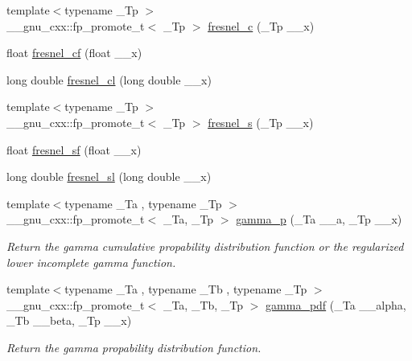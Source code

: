 \begin{DoxyCompactItemize}
{\footnotesize template$<$typename \+\_\+\+Tp $>$ }\\\+\_\+\+\_\+gnu\+\_\+cxx\+::fp\+\_\+promote\+\_\+t$<$ \+\_\+\+Tp $>$ \hyperlink{group__gnu__math__spec__func_ga92a3585165bfad3f9972fb4210140d22}{fresnel\+\_\+c} (\+\_\+\+Tp \+\_\+\+\_\+x)
\item 
float \hyperlink{group__gnu__math__spec__func_ga02ca7579d5aef96cba69e38e988e7a42}{fresnel\+\_\+cf} (float \+\_\+\+\_\+x)
\item 
long double \hyperlink{group__gnu__math__spec__func_gaa3f82a7569d61c2f7c194d2e64b616f8}{fresnel\+\_\+cl} (long double \+\_\+\+\_\+x)
\item 
{\footnotesize template$<$typename \+\_\+\+Tp $>$ }\\\+\_\+\+\_\+gnu\+\_\+cxx\+::fp\+\_\+promote\+\_\+t$<$ \+\_\+\+Tp $>$ \hyperlink{group__gnu__math__spec__func_ga075a32b4f59a5fa67c2e28232c89ad45}{fresnel\+\_\+s} (\+\_\+\+Tp \+\_\+\+\_\+x)
\item 
float \hyperlink{group__gnu__math__spec__func_ga73450b8fd4abd5d8d3191dd6cbcda808}{fresnel\+\_\+sf} (float \+\_\+\+\_\+x)
\item 
long double \hyperlink{group__gnu__math__spec__func_ga5d6ac976fa316df9b943f92bafe1407d}{fresnel\+\_\+sl} (long double \+\_\+\+\_\+x)
\item 
{\footnotesize template$<$typename \+\_\+\+Ta , typename \+\_\+\+Tp $>$ }\\\+\_\+\+\_\+gnu\+\_\+cxx\+::fp\+\_\+promote\+\_\+t$<$ \+\_\+\+Ta, \+\_\+\+Tp $>$ \hyperlink{group__gnu__math__spec__func_ga692601fa7508c0b97bf549e6362a49b9}{gamma\+\_\+p} (\+\_\+\+Ta \+\_\+\+\_\+a, \+\_\+\+Tp \+\_\+\+\_\+x)
\begin{DoxyCompactList}\small\item\em Return the gamma cumulative propability distribution function or the regularized lower incomplete gamma function. \end{DoxyCompactList}\item 
{\footnotesize template$<$typename \+\_\+\+Ta , typename \+\_\+\+Tb , typename \+\_\+\+Tp $>$ }\\\+\_\+\+\_\+gnu\+\_\+cxx\+::fp\+\_\+promote\+\_\+t$<$ \+\_\+\+Ta, \+\_\+\+Tb, \+\_\+\+Tp $>$ \hyperlink{group__gnu__math__spec__func_ga55f530c37387a6c10c601c5838f3be00}{gamma\+\_\+pdf} (\+\_\+\+Ta \+\_\+\+\_\+alpha, \+\_\+\+Tb \+\_\+\+\_\+beta, \+\_\+\+Tp \+\_\+\+\_\+x)
\begin{DoxyCompactList}\small\item\em Return the gamma propability distribution function. \end{DoxyCompactList}\item 

\end{DoxyCompactItemize}

